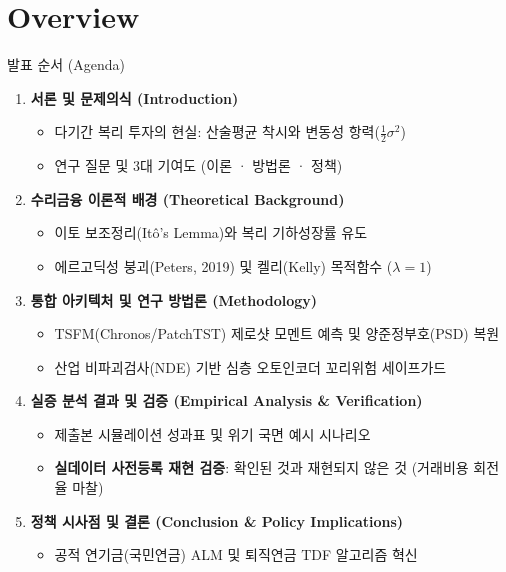 \section{Overview}

\begin{frame}{발표 순서 (Agenda)}
\begin{enumerate}
  \setlength{\itemsep}{8pt}
  \item \textbf{서론 및 문제의식 (Introduction)}
  \begin{itemize}
    \item 다기간 복리 투자의 현실: 산술평균 착시와 변동성 항력($\frac{1}{2}\sigma^2$)
    \item 연구 질문 및 3대 기여도 (이론 · 방법론 · 정책)
  \end{itemize}
  
  \item \textbf{수리금융 이론적 배경 (Theoretical Background)}
  \begin{itemize}
    \item 이토 보조정리(Itô's Lemma)와 복리 기하성장률 유도
    \item 에르고딕성 붕괴(Peters, 2019) 및 켈리(Kelly) 목적함수 ($\lambda=1$)
  \end{itemize}
  
  \item \textbf{통합 아키텍처 및 연구 방법론 (Methodology)}
  \begin{itemize}
    \item TSFM(Chronos/PatchTST) 제로샷 모멘트 예측 및 양준정부호(PSD) 복원
    \item 산업 비파괴검사(NDE) 기반 심층 오토인코더 꼬리위험 세이프가드
  \end{itemize}
  
  \item \textbf{실증 분석 결과 및 검증 (Empirical Analysis \& Verification)}
  \begin{itemize}
    \item 제출본 시뮬레이션 성과표 및 위기 국면 예시 시나리오
    \item \textbf{실데이터 사전등록 재현 검증}: 확인된 것과 재현되지 않은 것 (거래비용 회전율 마찰)
  \end{itemize}
  
  \item \textbf{정책 시사점 및 결론 (Conclusion \& Policy Implications)}
  \begin{itemize}
    \item 공적 연기금(국민연금) ALM 및 퇴직연금 TDF 알고리즘 혁신
  \end{itemize}
\end{enumerate}
\end{frame}
